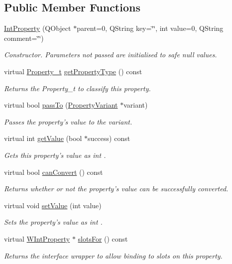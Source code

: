\subsection*{Public Member Functions}
\begin{DoxyCompactItemize}
\item 
\hyperlink{class_int_property_a0ac475dedc13dbe672277438328fa278}{Int\-Property} (Q\-Object $\ast$parent=0, Q\-String key=\char`\"{}\char`\"{}, int value=0, Q\-String comment=\char`\"{}\char`\"{})
\begin{DoxyCompactList}\small\item\em Constructor. Parameters not passed are initialised to safe null values. \end{DoxyCompactList}\item 
virtual \hyperlink{group___property_classes_ga38f1ccddda12c7cb50b868c9f789ee37}{Property\-\_\-t} \hyperlink{class_int_property_a3747830573f747807d40a6cb201b2137}{get\-Property\-Type} () const 
\begin{DoxyCompactList}\small\item\em Returns the Property\-\_\-t to classify this property. \end{DoxyCompactList}\item 
virtual bool \hyperlink{class_int_property_af7c54a340e388a667f68b6ddbec68f6e}{pass\-To} (\hyperlink{class_property_variant}{Property\-Variant} $\ast$variant)
\begin{DoxyCompactList}\small\item\em Passes the property's value to the variant. \end{DoxyCompactList}\item 
virtual int \hyperlink{class_int_property_a721123bb68dd46f0d0247012b663d4ba}{get\-Value} (bool $\ast$success) const 
\begin{DoxyCompactList}\small\item\em Gets this property's value as int . \end{DoxyCompactList}\item 
virtual bool \hyperlink{class_int_property_a3ce0216893c32bae0bb469fe1f82f83c}{can\-Convert} () const 
\begin{DoxyCompactList}\small\item\em Returns whether or not the property's value can be successfully converted. \end{DoxyCompactList}\item 
virtual void \hyperlink{class_int_property_a9c3b7ced3c8b7d8fbb9f739449e5622e}{set\-Value} (int value)
\begin{DoxyCompactList}\small\item\em Sets the property's value as int . \end{DoxyCompactList}\item 
virtual \hyperlink{class_w_int_property}{W\-Int\-Property} $\ast$ \hyperlink{class_int_property_a2064a016e6cb84275819e4390c7e9a84}{slots\-For} () const 
\begin{DoxyCompactList}\small\item\em Returns the interface wrapper to allow binding to slots on this property. \end{DoxyCompactList}\end{DoxyCompactItemize}
